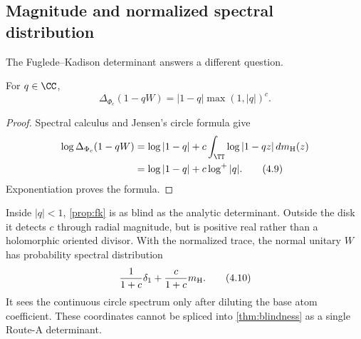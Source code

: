 \subsection{Magnitude and normalized spectral distribution}

The Fuglede--Kadison determinant answers a different question.

\begin{proposition}
\label{prop:fk}
For $q\in\CC$,
\[
 \Delta_{\Phi_c}(1-qW)
 =|1-q|\max(1,|q|)^c.                                     \tag{4.8}
\]
\end{proposition}

\begin{proof}
Spectral calculus and Jensen's circle formula give
\begin{align}
 \log\Delta_{\Phi_c}(1-qW)
 &=\log|1-q|+c\int_\TT\log|1-qz|\,dm_{\rm H}(z)\\
 &=\log|1-q|+c\log^+|q|.                                 \tag{4.9}
\end{align}
Exponentiation proves the formula.
\end{proof}

Inside $|q|<1$, \cref{prop:fk} is as blind as the analytic determinant.
Outside the disk it detects $c$ through radial magnitude, but is positive
real rather than a holomorphic oriented divisor.  With the normalized trace,
the normal unitary $W$ has probability spectral distribution
\[
 \frac1{1+c}\delta_1+\frac{c}{1+c}m_{\rm H}.              \tag{4.10}
\]
It sees the continuous circle spectrum only after diluting the base atom
coefficient.  These coordinates cannot be spliced into \cref{thm:blindness}
as a single Route-A determinant.
